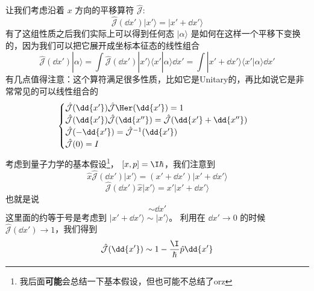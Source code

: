 让我们考虑沿着 $x$ 方向的平移算符 $\hat{\mathcal J}$: 
\begin{equation}
\hat{\mathcal{J}}(\dd{x'})|x'\rangle = |x'+\dd{x'}\rangle
\end{equation}
有了这组性质之后我们实际上可以得到任何态 $|\alpha\rangle$ 是如何在这样一个平移下变换的，因为我们可以把它展开成坐标本征态的线性组合
\begin{equation}
\hat{\mathcal{J}}(\dd{x'})|\alpha\rangle = \int\hat{\mathcal{J}}(\dd{x'})|x'\rangle\langle x'|\alpha\rangle \dd{x'} = \int|x'+\dd{x'}\rangle\langle x'|\alpha\rangle \dd{x'}
\end{equation}
有几点值得注意：这个算符满足很多性质，比如它是Unitary的，再比如说它是非常常见的可以线性组合的
\begin{equation}
\begin{cases}
\hat{\mathcal{J}}(\dd{x'})\hat{\mathcal{J}}\Her (\dd{x'}) = 1\\
\hat{\mathcal{J}}(\dd{x'})\hat{\mathcal{J}}(\dd{x''}) = \hat{\mathcal{J}}(\dd{x'} + \dd{x''})\\
\hat{\mathcal{J}}(-\dd{x'}) = \hat{\mathcal{J}}^{-1}(\dd{x'})\\
\hat{\mathcal{J}}(0) = I
\end{cases}
\end{equation}
考虑到量子力学的基本假设\footnote{我后面\textbf{可能}会总结一下基本假设，但也可能不总结了orz}， $[x,p] = \I\hbar$，我们注意到
\begin{equation}
\hat{x}\hat{\mathcal{J}}(\dd{x'})|x'\rangle = (x'+\dd{x'})|x'+\dd{x'}\rangle
\end{equation}
\begin{equation}
\hat{\mathcal{J}}(\dd{x'})\hat{x}|x'\rangle = x'|x'+\dd{x'}\rangle
\end{equation}
也就是说
\begin{equation}
[\hat{x},\hat{\mathcal{J}}(\dd{x'})] \sim \dd{x'}
\end{equation}
这里面的约等于号是考虑到 $|x'+\dd{x'}\rangle \sim |x'\rangle$。 利用在 $\dd{x'}\rightarrow0$ 的时候 $\hat{\mathcal{J}}(\dd{x'})\rightarrow1$，我们得到
\begin{equation}
\hat{\mathcal{J}}(\dd{x'}) \sim 1-\frac{\I}{\hbar}\hat{p}\dd{x'}
\end{equation}

